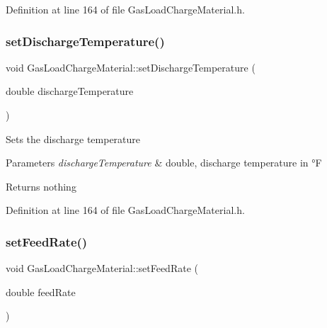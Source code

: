 Definition at line 164 of file Gas\+Load\+Charge\+Material.\+h.

\mbox{\label{class_gas_load_charge_material_a6c53344d5370a1e9b7321a530a6843c0}} 
\subsubsection{\texorpdfstring{set\+Discharge\+Temperature()}{setDischargeTemperature()}\hspace{0.1cm}{\footnotesize\ttfamily [3/3]}}
{\footnotesize\ttfamily void Gas\+Load\+Charge\+Material\+::set\+Discharge\+Temperature (\begin{DoxyParamCaption}\item[{double}]{discharge\+Temperature }\end{DoxyParamCaption})\hspace{0.3cm}{\ttfamily [inline]}}

Sets the discharge temperature


\begin{DoxyParams}{Parameters}
{\em discharge\+Temperature} & double, discharge temperature in °F\\
\hline
\end{DoxyParams}
\begin{DoxyReturn}{Returns}
nothing 
\end{DoxyReturn}


Definition at line 164 of file Gas\+Load\+Charge\+Material.\+h.

\mbox{\label{class_gas_load_charge_material_a922b728dfd109d1c1684d7dfad82ec8e}} 
\subsubsection{\texorpdfstring{set\+Feed\+Rate()}{setFeedRate()}\hspace{0.1cm}{\footnotesize\ttfamily [1/3]}}
{\footnotesize\ttfamily void Gas\+Load\+Charge\+Material\+::set\+Feed\+Rate (\begin{DoxyParamCaption}\item[{double}]{feed\+Rate }\end{DoxyParamCaption})\hspace{0.3cm}{\ttfamily [inline]}}

